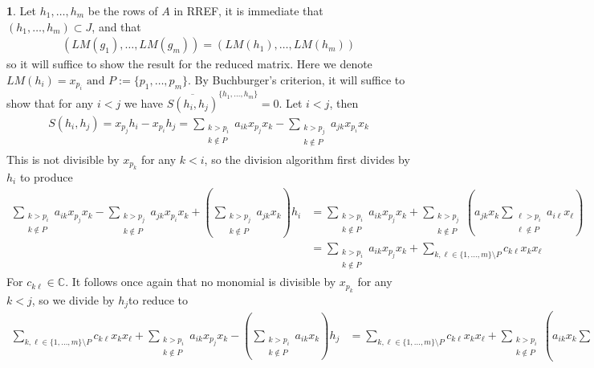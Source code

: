 \documentclass[11pt]{article}
\theoremstyle{definition}
\newtheorem{pb}{}
\newcommand{\set}[1]{\{#1\}}
\newcommand{\tand}{\text{ and }}
\begin{document}
    \begin{pb}
        Let \(h_1,\hdots,h_m\) be the rows of \(A\) in RREF, it is immediate that \((h_1,\hdots,h_m) \subset J\), and that
        \begin{align*}
            (LM(g_1),\hdots,LM(g_m)) = (LM(h_1),\hdots,LM(h_m))
        \end{align*}
        so it will suffice to show the result for the reduced matrix. Here we denote \(LM(h_i) = x_{p_i} \tand P := \set{p_1,\hdots,p_m}\). By Buchburger's criterion, it will suffice to show that for any \(i < j\) we have \(\overline{S(h_i,h_j)}^{\set{h_1,\hdots,h_m}} = 0\). Let \(i < j\), then
        \begin{align*}
            S(h_i,h_j) = x_{p_j}h_i - x_{p_i}h_j = \sum_{\substack{k > p_i \\ k \not \in P}} a_{ik}x_{p_j}x_k - \sum_{\substack{k > p_j \\ k \not \in P}} a_{jk}x_{p_i}x_k
        \end{align*}
        This is not divisible by \(x_{p_k}\) for any \(k < i\), so the division algorithm first divides by \(h_i\) to produce
        \begin{align*}
            \sum_{\substack{k > p_i \\ k \not \in P}} a_{ik}x_{p_j}x_k - \sum_{\substack{k > p_j \\ k \not \in P}} a_{jk}x_{p_i}x_k + \left(\sum_{\substack{k > p_j \\ k \not \in P}} a_{jk}x_k\right)h_i
            &= \sum_{\substack{k > p_i \\ k \not \in P}} a_{ik}x_{p_j}x_k + \sum_{\substack{k > p_j \\ k \not \in P}}\left(a_{jk}x_k\sum_{\substack{\ell > p_i \\ \ell \not \in P}} a_{i\ell}x_\ell\right) \\
            &= \sum_{\substack{k > p_i \\ k \not \in P}} a_{ik}x_{p_j}x_k + \sum_{k,\ell \in \set{1,\hdots,m} \setminus P}c_{k\ell} x_kx_\ell
        \end{align*}
        For \(c_{k\ell} \in \mathbb{C}\). It follows once again that no monomial is divisible by \(x_{p_k}\) for any \(k < j\), so we divide by \(h_j\)to reduce to
        \begin{align*}
            \sum_{k,\ell \in \set{1,\hdots,m} \setminus P}c_{k\ell} x_kx_\ell + \sum_{\substack{k > p_i \\ k \not \in P}} a_{ik}x_{p_j}x_k - \left(\sum_{\substack{k > p_i \\ k \not \in P}} a_{ik}x_k\right)h_j &= \sum_{k,\ell \in \set{1,\hdots,m} \setminus P}c_{k\ell} x_kx_\ell + \sum_{\substack{k > p_i \\ k \not \in P}}\left(a_{ik}x_k\sum_{\substack{\ell > p_j \\ \ell \not \in P}} a_{j\ell}x_\ell\right) \\

\end{align*}
\end{pb}
\end{document}
